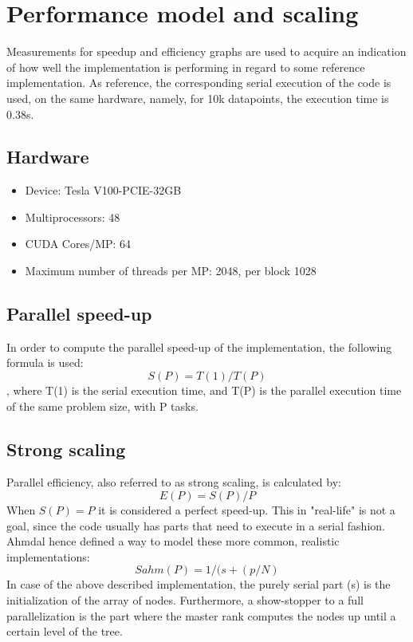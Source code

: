 \documentclass[11pt]{article}
\begin{document}
\section{Performance model and scaling}
Measurements for speedup and efficiency graphs are used to acquire an indication of how well the implementation is performing in regard to some reference
implementation. As reference, the corresponding serial execution of the code is used, on the same hardware, namely, for 10k datapoints, the execution time is 0.38s.
\subsection{Hardware}
\begin{itemize}
\item Device: Tesla V100-PCIE-32GB
\item Multiprocessors: 48
\item CUDA Cores/MP: 64
\item Maximum number of threads per MP: 2048, per block 1028
\end{itemize}
\subsection{Parallel speed-up}
In order to compute the parallel speed-up of the implementation, the following formula is used:
\begin{equation} \label{eqn}
	S(P) = {T(1) / T(P)} 
\end{equation}
, where T(1) is the serial execution time, and T(P) is the parallel execution time of the same problem size, with P tasks.
\subsection{Strong scaling}
Parallel efficiency, also referred to as strong scaling, is calculated by:
\begin{equation} \label{eqn}
	E(P) = {S(P) / P} 
\end{equation}
When $S(P)=P$ it is considered a perfect speed-up. This in "real-life" is not a goal, since the code usually has parts that need to execute in a serial fashion. Ahmdal hence defined a way to model these more common, realistic implementations:
\begin{equation} \label{eqn}
	Sahm(P) = {1 /(s + (p/N)} 
\end{equation}
In case of the above described implementation, the purely serial part (s) is the initialization of the array of nodes. Furthermore, a show-stopper to a full parallelization is the part where the master rank computes the nodes up until a certain level of the tree.
\end{document}
